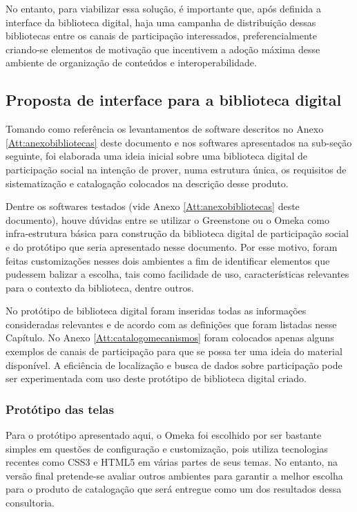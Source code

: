 No entanto, para viabilizar essa solução, é importante que, após definida a interface da biblioteca digital, haja uma campanha de distribuição dessas bibliotecas entre os canais de participação interessados, preferencialmente criando-se elementos de motivação que incentivem a adoção máxima desse ambiente de organização de conteúdos e interoperabilidade.

\subsection{Proposta de interface para a biblioteca digital}
\label{sub:prototipo_biblioteca}

Tomando como referência os levantamentos de software descritos no Anexo \ref{Att:anexobibliotecas} deste documento e nos softwares apresentados na sub-seção seguinte, foi elaborada uma ideia inicial sobre uma biblioteca digital de participação social na intenção de prover, numa estrutura única, os requisitos de sistematização e catalogação colocados na descrição desse produto.
 
Dentre os softwares testados (vide Anexo \ref{Att:anexobibliotecas} deste documento), houve dúvidas entre se utilizar o Greenstone ou o Omeka como infra-estrutura básica para construção da biblioteca digital de participação social e do protótipo que seria apresentado nesse documento. Por esse motivo, foram feitas customizações nesses dois ambientes a fim de identificar elementos que pudessem balizar a escolha, tais como facilidade de uso, características relevantes para o contexto da biblioteca, dentre outros.

No protótipo de biblioteca digital foram inseridas todas as informações consideradas relevantes e de acordo com as definições que foram listadas nesse Capítulo. No Anexo \ref{Att:catalogomecanismos} foram colocados apenas alguns exemplos de canais de participação para que se possa ter uma ideia do material disponível. A eficiência de localização e busca de dados sobre participação pode ser experimentada com uso deste protótipo de biblioteca digital criado. 

\subsubsection{Protótipo das telas}

Para o protótipo apresentado aqui, o Omeka foi escolhido por ser bastante simples em questões de configuração e customização, pois utiliza tecnologias recentes como CSS3 e HTML5 em várias partes de seus temas. No entanto, na versão final pretende-se avaliar outros ambientes para garantir a melhor escolha para o produto de catalogação que será entregue como um dos resultados dessa consultoria. 

